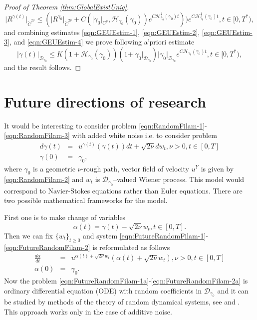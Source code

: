 \documentclass[11pt,a4paper,leqno]{amsart}%
\newcommand\half{\frac12}
\theoremstyle{plain}
\theoremstyle{remark}
\theoremstyle{plain}
\numberwithin{equation}{section}
\begin{document}
\begin{proof}[Proof of Theorem \ref{thm:GlobalExistUniq}]
\begin{equation}
\vert R^{\gamma(t)}\vert_{\tilde{C}^{2\nu}}\leq(\vert R^{\gamma_0}\vert_{\tilde{C}^{2\nu}}+C(\vert \gamma_0\vert_{C^{\nu}},\mathcal{H}_{\gamma_0}(\gamma_0))e^{C\mathcal{H}_{\gamma_0}^{\half}(\gamma_0)t}))
e^{C\mathcal{H}_{\gamma_0}^{\half}(\gamma_0)t},t\in[0,T^*),\label{eqn:GEUEstim-4}
\end{equation}
and combining estimates \eqref{eqn:GEUEstim-1},
\eqref{eqn:GEUEstim-2}, \eqref{eqn:GEUEstim-3}, and
\eqref{eqn:GEUEstim-4} we prove following a'priori estimate
\begin{equation}
\vert \gamma(t)\vert_{\mathcal{D}_{\gamma_0}}\leq
K(1+\mathcal{H}_{\gamma_0}(\gamma_0))(1+\vert \gamma_0\vert_{\mathcal{D}_{\gamma_0}})\vert \gamma_0\vert_{\mathcal{D}_{\gamma_0}}e^{C\mathcal{H}_{\gamma_0}(\gamma_0)t},t\in[0,T^*),\label{eqn:GEUEstim-5}
\end{equation}
and the result follows.
\end{proof}

\section{Future directions of research}

It would be interesting to consider problem
\eqref{eqn:RandomFilam-1}-\eqref{eqn:RandomFilam-3} with added
white noise i.e. to consider problem
\begin{eqnarray}
d\gamma(t) &=& u^{\gamma(t)}(\gamma(t))dt+\sqrt{2\nu}dw_t,\nu>0,t\in [0,T] \label{eqn:FutureRandomFilam-1}\\
\gamma(0) &=& \gamma_0,\label{eqn:FutureRandomFilam-2}
\end{eqnarray}
where $\gamma_0$ is a geometric $\nu$-rough path, vector field of velocity $u^Y$ is given by
\eqref{eqn:RandomFilam-2} and $w_t$ is $\mathcal{D}_{\gamma_0}$--valued
Wiener process. This model would correspond to Navier-Stokes
equations rather than Euler equations. There are two possible
mathematical frameworks for the model.

First one is to make change of variables
$$
\alpha(t)=\gamma(t)-\sqrt{2\nu}w_t, t\in[0,T].
$$
Then we can fix $\{w_t\}_{t\geq 0}$ and system
\eqref{eqn:FutureRandomFilam-1}-\eqref{eqn:FutureRandomFilam-2} is
reformulated as follows
\begin{eqnarray}
\frac{d\alpha}{dt} &=& u^{\alpha(t)+\sqrt{2\nu}w_t}(\alpha(t)+\sqrt{2\nu}w_t),\nu>0,t\in [0,T] \label{eqn:FutureRandomFilam-1a}\\
\alpha(0) &=& \gamma_0.\label{eqn:FutureRandomFilam-2a}
\end{eqnarray}
Now the problem
\eqref{eqn:FutureRandomFilam-1a}-\eqref{eqn:FutureRandomFilam-2a}
is ordinary differential equation (ODE) with random coefficients
in $\mathcal{D}_{\gamma_0}$ and it can be studied by methods of the theory
of random dynamical systems, see \cite{[Arnold-98]} and
\cite{[DuanLuSchmalfus-2003]}. This approach works only in the
case of additive noise.
\end{document}

